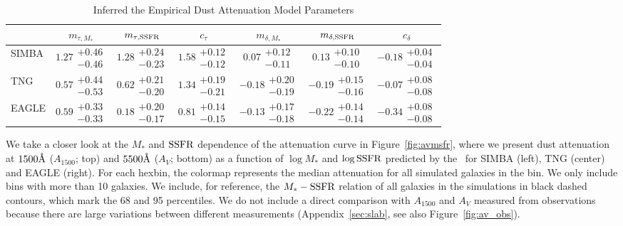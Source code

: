 \begin{table}
    \caption{Inferred the Empirical Dust Attenuation Model Parameters}
    \begin{tabular}{lcccccc} \toprule
        & $m_{\tau,M_*}$ & $m_{\tau,{\rm SSFR}}$ & $c_\tau$ & $m_{\delta,M_*}$ & $m_{\delta,{\rm SSFR}}$ & $c_\delta$ \\[3pt] \hline\hline
        SIMBA   & $1.27\substack{+0.46\\-0.46}$ &
        $1.28\substack{+0.24\\-0.23}$ & $1.58\substack{+0.12\\-0.12}$ &
        $0.07 \substack{+0.12\\-0.11}$ & $0.13 \substack{+0.10\\-0.10}$ &
        $-0.18\substack{+0.04\\-0.04}$ \\
        TNG     & $0.57\substack{+0.44\\-0.53}$ &
        $0.62\substack{+0.21\\-0.20}$ & $1.34\substack{+0.19\\-0.21}$ &
        $-0.18\substack{+0.20\\-0.19}$ & $-0.19\substack{+0.15\\-0.16}$ &
        $-0.07\substack{+0.08\\-0.08}$ \\
        EAGLE   & $0.59\substack{+0.33\\-0.33}$ &
        $0.18\substack{+0.20\\-0.17}$ & $0.81\substack{+0.14\\-0.15}$ &
        $-0.13\substack{+0.17\\-0.18}$ & $-0.22\substack{+0.14\\-0.14}$ &
        $-0.34\substack{+0.08\\-0.08}$\\
        \hline
    \end{tabular} \label{tab:posterior}
\end{table}

We take a closer look at the $M_*$ and ${\rm SSFR}$ dependence of the attenuation
curve in Figure~\ref{fig:avmsfr}, where we present dust attenuation at
$1500\AA$ ($A_{1500}$; top) and $5500\AA$
($A_V$; bottom) as a function of $\log M_*$ and $\log {\rm SSFR}$ predicted by the
\eda~for SIMBA (left), TNG (center) and EAGLE (right). 
For each hexbin, the colormap represents the median attenuation for all
simulated galaxies in the bin. 
We only include bins with more than 10 galaxies. 
We include, for reference, the $M_* - {\rm SSFR}$ relation of all galaxies in the
simulations in black dashed contours, which mark the 68 and 95 percentiles.
We do not include a direct comparison with $A_{1500}$ and $A_V$ measured
from observations because there are large variations between different
measurements (Appendix~\ref{sec:slab}, see also Figure~\ref{fig:av_obs}).  

